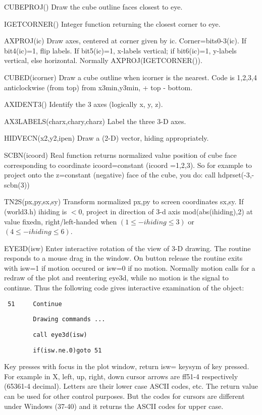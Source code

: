 \documentclass[12pt]{article}
\begin{document}
CUBEPROJ() Draw the cube outline faces closest to eye.

IGETCORNER() Integer function returning the closest corner to eye.

AXPROJ(ic) Draw axes, centered at corner given by ic.
Corner=bits0-3(ic). If bit4(ic)=1, flip labels.  If bit5(ic)=1,
x-labels vertical; if bit6(ic)=1, y-labels vertical, else horizontal.
Normally AXPROJ(IGETCORNER()).

CUBED(icorner) Draw a cube outline when icorner is the nearest.
Code is 1,2,3,4 anticlockwise (from top) from x3min,y3min, + top - bottom.

AXIDENT3() Identify the 3 axes (logically x, y, z).

AX3LABELS(charx,chary,charz) Label the three 3-D axes.

HIDVECN(x2,y2,ipen) Draw a (2-D) vector, hiding appropriately.

SCBN(icoord) Real function returns normalized value position of cube face
corresponding to coordinate icoord=constant (icoord =1,2,3). So for
example to project onto the z=constant (negative) face of the cube,
you do: call hdprset(-3,-scbn(3))

TN2S(px,py,sx,sy) Transform normalized px,py to screen coordinates
sx,sy. If (world3.h) ihiding is $<0$, project in direction of 3-d axis
mod(abs(ihiding),2) at value fixedn, right/left-handed when
$(1\le-ihiding\le3 )$ or $(4\le-ihiding\le 6)$.

EYE3D(isw) Enter interactive rotation of the view of 3-D drawing. The
routine responds to a mouse drag in the window. On button release the
routine exits with isw=1 if motion occured or isw=0 if no
motion. Normally motion calls for a redraw of the plot and reentering
eye3d, while no motion is the signal to continue. Thus the following
code gives interactive examination of the object:

\verb! 51     Continue!

\verb!        Drawing commands ...!

\verb!        call eye3d(isw)!

\verb!        if(isw.ne.0)goto 51!


Key presses with focus in the plot window, return isw= keysym of key
pressed. For example in X, left, up, right, down cursor arrows are
ff51-4 respectively (65361-4 decimal). Letters are their lower case
ASCII codes, etc.  The return value can be used for other control
purposes. But the codes for cursors are different under Windows
(37-40) and it returns the ASCII codes for upper case.
 
\end{document}
